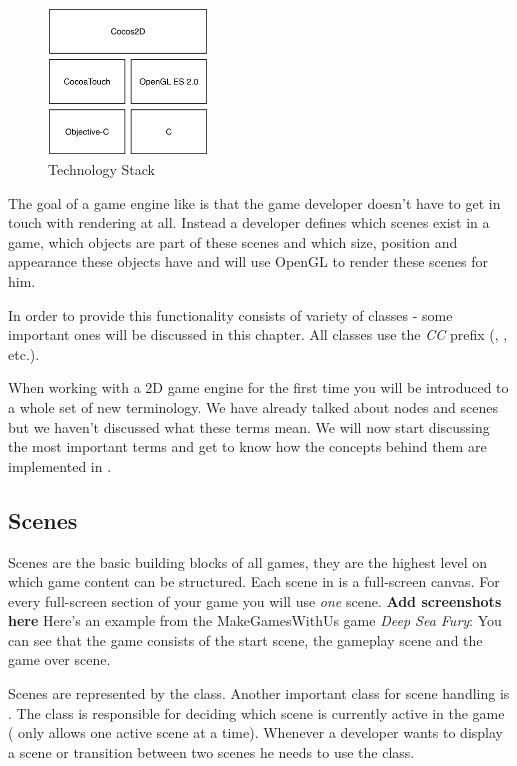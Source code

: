 \begin{figure}[H]
		\centering
		\includegraphics[width=120pt]{images/cocos2d/TechnologyStack.png}     
		\caption{\cocos{} Technology Stack}
\end{figure}

The goal of a game engine like \cocos{} is that the game developer doesn't have
to get in touch with rendering at all. Instead a developer defines which scenes
exist in a game, which objects are part of these scenes and which size, position and appearance these objects have and \cocos{} 
will use OpenGL to render these scenes for him. 

In order to provide this functionality \cocos{} consists of variety of classes -
some important ones will be discussed in this chapter. All \cocos{} classes use the \textit{CC} prefix (\ccscene{}, \ccnode{}, etc.).

When working with a 2D game engine for the first time you will be introduced to
a whole set of new terminology. We have already talked about nodes and scenes
but we haven't discussed what these terms mean. We will now start discussing the
most important terms and get to know how the concepts behind them are
implemented in \cocos{}.

\subsection{Scenes}
Scenes are the basic building blocks of all \cocos{} games, they are the
highest level on which game content can be structured. Each scene in \cocos{} is
a full-screen canvas. For every full-screen section of your game you will use
\textit{one} scene.
\textbf{Add screenshots here}
Here's an example from the MakeGamesWithUs game \textit{Deep Sea Fury}:
You can see that the game consists of the start scene, the gameplay scene and
the game over scene.

Scenes are represented by the \ccscene{} class. Another
important \cocos{} class for scene handling is \ccdirector{}. The \ccdirector{}
class is responsible for deciding which scene is currently active in the game
(\cocos{} only allows one active scene at a time). Whenever a developer wants to
display a scene or transition between two scenes he needs to use the
\ccdirector{} class.

